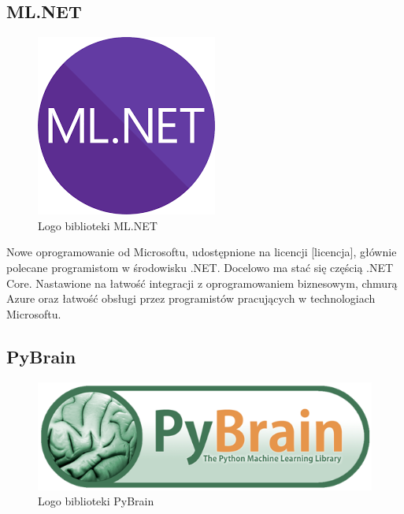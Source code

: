 \documentclass[12pt,a4paper,twoside,titlepage,openright]{book}
\begin{document}
{\subsection{ML.NET}
\begin{figure}[h]
	\centering
			\includegraphics[resolution=120]{ML_NET.png}
		\caption{Logo biblioteki ML.NET}
\end{figure}
Nowe oprogramowanie od Microsoftu, udostępnione na licencji [licencja], głównie polecane programistom w środowisku .NET. Docelowo ma stać się częścią .NET Core. Nastawione na łatwość integracji z oprogramowaniem biznesowym, chmurą Azure oraz łatwość obsługi przez programistów pracujących w technologiach Microsoftu.

\subsection{PyBrain}
\begin{figure}[h]
	\centering
			\includegraphics[resolution=120]{PyBrain.png}
		\caption{Logo biblioteki PyBrain}
\end{figure}


}
\end{document}
